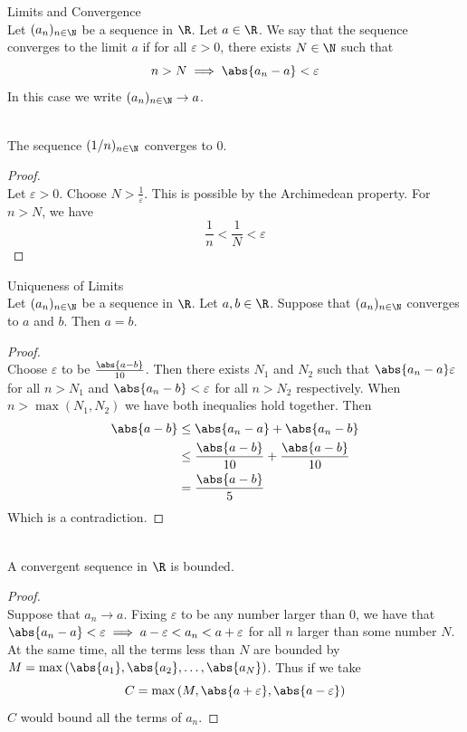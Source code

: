 \documentclass[a4paper]{article}
\begin{document}
\begin{defn}{Limits and Convergence}{}\\
Let $(a_n)_{n\in\N}$ be a sequence in $\R$. Let $a\in\R$. We say that the sequence converges to the limit $a$ if for all $\varepsilon>0$, there exists $N\in\N$ such that $$n>N\implies \abs{a_n-a}<\varepsilon$$ In this case we write $(a_n)_{n\in\N}\to a$. 
\end{defn}

\begin{eg}{}{}\\
The sequence $(1/n)_{n\in\N}$ converges to $0$. 
\begin{proof}\\
Let $\varepsilon>0$. Choose $N>\frac{1}{\varepsilon}$. This is possible by the Archimedean property. For $n>N$, we have $$\frac{1}{n}<\frac{1}{N}<\varepsilon$$
\end{proof}
\end{eg}

\begin{prp}{Uniqueness of Limits}{}\\
Let $(a_n)_{n\in\N}$ be a sequence in $\R$. Let $a,b\in\R$. Suppose that $(a_n)_{n\in\N}$ converges to $a$ and $b$. Then $a=b$. 
\begin{proof}\\
Choose $\varepsilon$ to be $\frac{\abs{a-b}}{10}$. Then there exists $N_1$ and $N_2$ such that $\abs{a_n-a}\varepsilon$ for all $n>N_1$ and $\abs{a_n-b}<\varepsilon$ for all $n>N_2$ respectively. When $n>\max{(N_1,N_2)}$ we have both inequalies hold together. Then 
\begin{align*}
\abs{a-b}&\leq\abs{a_n-a}+\abs{a_n-b}\\
&\leq \frac{\abs{a-b}}{10}+\frac{\abs{a-b}}{10}\\
&=\frac{\abs{a-b}}{5}
\end{align*}
Which is a contradiction. 
\end{proof}
\end{prp}

\begin{prp}{}{}\\ A convergent sequence in $\R$ is bounded. 
\begin{proof}\\ Suppose that $a_n\to a$. Fixing $\varepsilon$ to be any number larger than 0, we have that $\abs{a_n-a}<\varepsilon\implies a-\varepsilon<a_n<a+\varepsilon$ for all $n$ larger than some number $N$. At the same time, all the terms less than $N$ are bounded by $M=\max{(\abs{a_1}, \abs{a_2}, \dots,\abs{a_N})}$. Thus if we take $$C=\max{(M,\abs{a+\varepsilon},\abs{a-\varepsilon})}$$ $C$ would bound all the terms of $a_n$. 
\end{proof}
\end{prp}
\end{document}
